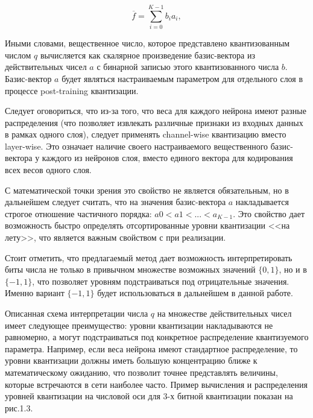 \begin{equation}
\overline{f} = \sum \limits_{i = 0}^{K - 1} b_i a_i,
\end{equation}

Иными словами, вещественное число, которое представлено квантизованным числом $q$ вычисляется как скалярное произведение базис-вектора из действительных чисел $a$ с бинарной записью этого квантизованного числа $b$. Базис-вектор $a$ будет являться настраиваемым параметром для отдельного слоя в процессе post-training квантизации. 

Следует оговориться, что из-за того,  что веса для каждого нейрона имеют разные распределения (что позволяет извлекать различные признаки из входных данных в рамках одного слоя), следует применять channel-wise квантизацию вместо layer-wise. Это означает наличие своего настраиваемого вещественного базис-вектора у каждого из нейронов слоя, вместо единого вектора для кодирования всех весов одного слоя.

С математической точки зрения это свойство не является обязательным, но в дальнейшем следует считать, что на значения базис-вектора $a$ накладывается строгое отношение частичного порядка: $a0 < a1 < ... < a_{K - 1}$. Это свойство дает возможность быстро определять отсортированные уровни квантизации <<на лету>>, что является важным свойством с при реализации.

Стоит отметить, что предлагаемый метод дает возможность интерпретировать биты числа не только в привычном множестве возможных значений $\{ 0, 1 \}$, но и в $\{ -1, 1 \}$, что позволяет уровням подстраиваться под отрицательные значения. Именно вариант $\{ -1, 1 \}$ будет использоваться в дальнейшем в данной работе. 

Описанная схема интерпретации числа $q$ на множестве действительных чисел имеет следующее преимущество: уровни квантизации накладываются не равномерно, а могут подстраиваться под конкретное распределение квантизуемого параметра. Например, если веса нейрона имеют стандартное распределение, то уровни квантизации должны иметь большую концентрацию  ближе к математическому ожиданию, что позволит точнее представлять величины, которые встречаются в сети наиболее часто. Пример вычисления и распределения уровней квантизации на числовой оси для $3$-х битной квантизации показан на рис.1.3.


